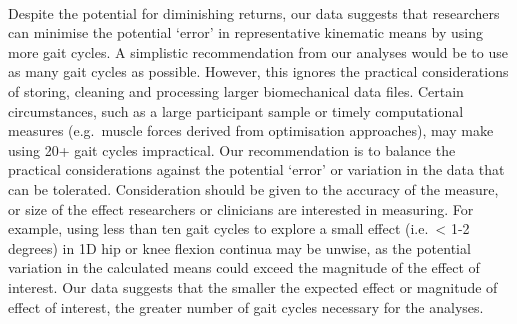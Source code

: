\documentclass[]{elsarticle} %
\begin{document}
~

Despite the potential for diminishing returns, our data suggests that
researchers can minimise the potential `error' in representative
kinematic means by using more gait cycles. A simplistic recommendation
from our analyses would be to use as many gait cycles as possible.
However, this ignores the practical considerations of storing, cleaning
and processing larger biomechanical data files. Certain circumstances,
such as a large participant sample or timely computational measures
(e.g.~muscle forces derived from optimisation approaches), may make
using 20+ gait cycles impractical. Our recommendation is to balance the
practical considerations against the potential `error' or variation in
the data that can be tolerated. Consideration should be given to the
accuracy of the measure, or size of the effect researchers or clinicians
are interested in measuring. For example, using less than ten gait
cycles to explore a small effect (i.e.~\textless{} 1-2 degrees) in 1D
hip or knee flexion continua may be unwise, as the potential variation
in the calculated means could exceed the magnitude of the effect of
interest. Our data suggests that the smaller the expected effect or
magnitude of effect of interest, the greater number of gait cycles
necessary for the analyses.

~
\end{document}
